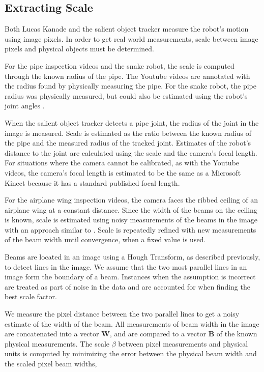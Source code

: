 \documentclass[letterpaper, 10 pt, conference]{ieeeconf}
\begin{document}
\subsection{Extracting Scale}

Both Lucas Kanade and the salient object tracker measure the robot's motion using image pixels. In order to get real world measurements, scale between image pixels and physical objects must be determined.

For the pipe inspection videos and the snake robot, the scale is computed through the known radius of the pipe. The Youtube videos are annotated with the radius found by physically measuring the pipe. For the snake robot, the pipe radius was physically measured, but could also be estimated using the robot's joint angles \cite{Enner2013}.

When the salient object tracker detects a pipe joint, the radius of the joint in the image is measured. Scale is estimated as the ratio between the known radius of the pipe and the measured radius of the tracked joint. Estimates of the robot's distance to the joint are calculated using the scale and the camera's focal length. For situations where the camera cannot be calibrated, as with the Youtube videos, the camera's focal length is estimated to be the same as a Microsoft Kinect because it has a standard published focal length.

For the airplane wing inspection videos, the camera faces the ribbed ceiling of an airplane wing at a constant distance. Since the width of the beams on the ceiling is known, scale is estimated using noisy measurements of the beams in the image with an approach similar to \cite{Lucey14}. Scale is repeatedly refined with new measurements of the beam width until convergence, when a fixed value is used.

Beams are located in an image using a Hough Transform, as described previously, to detect lines in the image. We assume that the two most parallel lines in an image form the boundary of a beam. Instances when the assumption is incorrect are treated as part of noise in the data and are accounted for when finding the best scale factor.

We measure the pixel distance between the two parallel lines to get a noisy estimate of the width of the beam. All measurements of beam width in the image are concatenated into a vector $\textbf{W}$, and are compared to a vector $\textbf{B}$ of the known physical measurements. The scale $\beta$ between pixel measurements and physical units is computed by minimizing the error between the physical beam width and the scaled pixel beam widths,
\end{document}
